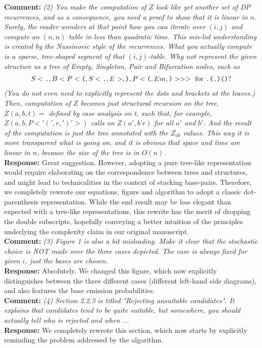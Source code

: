 \documentclass[11pt,hyperref,draft]{article} %
\newcommand{\Answer}[1]{\noindent\textsf{\textbf{Response: }}{\sf#1}\\}
\newcommand{\Comment}[1]{\noindent\textsf{\textbf{Comment: }}{\it#1}\\[.5em]}
\begin{document}
\Comment{(2) You make the computation of $Z$ look like yet another set of DP recurrences, and as a consequence, you need a proof to show that it is linear in $n$. Surely, the reader wonders at that point how you can iterate over $(i,j)$ and compute an $(n,n)$ table in less than quadratic time. This mis-led understanding is created by the Nussinovic style of the recurrences.
 What you actually compute is a sparse, tree-shaped segment of that $(i,j)$-table.
 Why not represent the given structure as a tree of Empty, Singleton, Pair and Bifurcation nodes, such as 
\begin{align*}
  S<\texttt{.},B<P<\texttt{(},S<\texttt{.},E>,\texttt{)},P<\texttt{(},Em,\texttt{)}>>> \text{ for {\tt .(.)()}}  ? 
\end{align*}
 (You do not even need to explicitly represent the dots and brackets at the leaves.)\\
 Then, computation of $Z$ becomes just structural recursion on the tree,
     $Z(a,b, t) =$ defined by case analysis on t, such that, for example,
     $Z(a,b,P<'(',r,')'>)$ calls on $Z(a',b' r)$ for all $a'$ and $b'$.
And the result of the computation is just the tree annotated with the $Z_{ab}$ values. 
This way it is more transparent what is going on, and it is obvious that space and time are linear in $n$, because the size of the tree is in $O(n)$.}
\Answer{Great suggestion. However, adopting a pure tree-like representation would require elaborating on the correspondence between trees and structures, and might lead to technicalities in the context of stacking base-pairs. Therefore, we completely rewrote our equations, figure and algorithm to adopt a classic dot-parenthesis representation. While the end result may be less elegant than expected with a tree-like representations, this rewrite has the merit of dropping the double subscripts, hopefully conveying a better intuition of the principles underlying the complexity claim in our original manuscript.}

\Comment{(3) Figure 1 is also a bit misleading. Make it clear that the stochastic choice is NOT made over the three cases depicted. The case is always fixed for given $i$, just the bases are chosen.}
\Answer{Absolutely. We changed this figure, which now explicitly distinguishes between the three different cases (different left-hand side diagrams), and also features the base emission probabilities.}

\Comment{(4) Section 2.2.3 is titled "Rejecting unsuitable candidates". It explains that candidates tend to be quite suitable, but somewhere, you should actually tell who is rejected and when ... }
\Answer{We completely rewrote this section, which now starts by explicitly reminding the problem addressed by the algorithm.}
\end{document}
